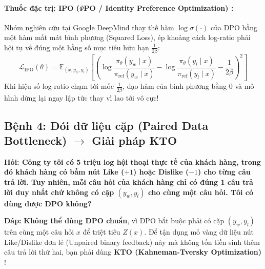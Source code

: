 \paragraph{Thuốc đặc trị: IPO ($\Psi$PO / Identity Preference Optimization) \citep{azar2024general}:}
Nhóm nghiên cứu tại Google DeepMind thay thế hàm $\log \sigma(\cdot)$ của DPO bằng một hàm mất mát bình phương (Squared Loss), ép khoảng cách log-ratio phải hội tụ về đúng một hằng số mục tiêu hữu hạn $\frac{1}{2\beta}$:
\begin{equation}
  \mathcal{L}_{\text{IPO}}(\theta) = \mathbb{E}_{(x, y_w, y_l)} \left[ \left( \log \frac{\pi_\theta(y_w \mid x)}{\pi_{\text{ref}}(y_w \mid x)} - \log \frac{\pi_\theta(y_l \mid x)}{\pi_{\text{ref}}(y_l \mid x)} - \frac{1}{2\beta} \right)^2 \right]
  \label{eq:ipo_loss}
\end{equation}
Khi hiệu số log-ratio chạm tới mốc $\frac{1}{2\beta}$, đạo hàm của bình phương bằng $0$ và mô hình dừng lại ngay lập tức thay vì lao tới vô cực!

\subsection{Bệnh 4: Đói dữ liệu cặp (Paired Data Bottleneck) \texorpdfstring{$\longrightarrow$}{->} Giải pháp KTO}

\begin{debate}
\textbf{Hỏi: Công ty tôi có 5 triệu log hội thoại thực tế của khách hàng, trong đó khách hàng có bấm nút Like ($+1$) hoặc Dislike ($-1$) cho từng câu trả lời. Tuy nhiên, mỗi câu hỏi của khách hàng chỉ có đúng 1 câu trả lời duy nhất chứ không có cặp $(y_w, y_l)$ cho cùng một câu hỏi. Tôi có dùng được DPO không?}

\textbf{Đáp:} \textbf{Không thể dùng DPO chuẩn}, vì DPO bắt buộc phải có cặp $(y_w, y_l)$ trên cùng một câu hỏi $x$ để triệt tiêu $Z(x)$. Để tận dụng mỏ vàng dữ liệu nút Like/Dislike đơn lẻ (Unpaired binary feedback) này mà không tốn tiền sinh thêm câu trả lời thứ hai, bạn phải dùng \textbf{KTO (Kahneman-Tversky Optimization)} \citep{ethayarajh2024kto}!
\end{debate}

